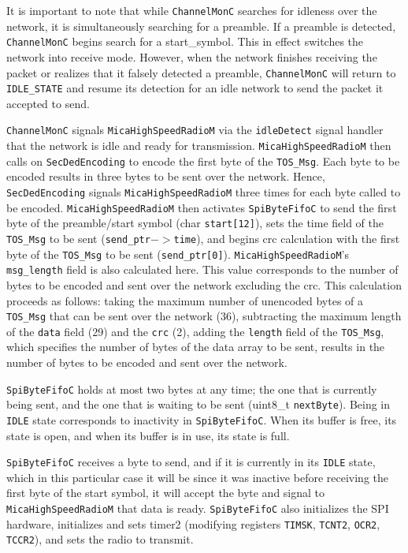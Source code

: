 \documentclass[11pt]{article}
\begin{document}
It is important to note that while {\tt ChannelMonC} searches for idleness
over the network, it is simultaneously searching for a preamble. If a
preamble is detected, {\tt ChannelMonC} begins search for a start\_symbol.
This in effect switches the network into receive mode.  However,
when the network finishes receiving the packet or realizes that it
falsely detected a preamble, {\tt ChannelMonC} will return to {\tt IDLE\_STATE}
and resume its detection for an idle network to send the packet it
accepted to send. 

{\tt ChannelMonC} signals {\tt MicaHighSpeedRadioM} via the {\tt idleDetect} signal
handler that the network is idle and ready for transmission.
{\tt MicaHighSpeedRadioM} then calls on {\tt SecDedEncoding} to encode the first
byte of the {\tt TOS\_Msg}.  Each byte to be encoded results in three bytes
to be sent over the network. Hence, {\tt SecDedEncoding} signals
{\tt MicaHighSpeedRadioM} three times for each byte called to be
encoded. {\tt MicaHighSpeedRadioM} then activates {\tt SpiByteFifoC} to send the
first byte of the preamble/start symbol (char {\tt start[12]}), sets the
time field of the {\tt TOS\_Msg} to be sent ({\tt send\_ptr$->$time}), and begins crc
calculation with the first byte of the {\tt TOS\_Msg} to be sent
({\tt send\_ptr[0]}). {\tt MicaHighSpeedRadioM}'s {\tt msg\_length} field is also
calculated here. This value corresponds to the number of bytes to be
encoded and sent over the network excluding the crc. This calculation proceeds as follows: taking the
maximum number of unencoded bytes of a {\tt TOS\_Msg} that can be sent over
the network (36), subtracting the maximum length of the {\tt data} field
(29) and the {\tt crc} (2), adding the {\tt length} field of the
{\tt TOS\_Msg}, which specifies the number of bytes of the data array to be sent,
results in the number of bytes to be encoded and sent over the
network.  

{\tt SpiByteFifoC} holds at most two bytes at any time; the one that is
currently being sent, and the one that is waiting to be sent (uint8\_t
{\tt nextByte}). Being in {\tt IDLE} state corresponds to inactivity in
{\tt SpiByteFifoC}. When its buffer is free, its state is open, and when its buffer is
in use, its state is full.

{\tt SpiByteFifoC} receives a byte to send, and if it is
currently in its {\tt IDLE} state, which in this particular case it will be
since it was inactive before receiving the first byte of the start
symbol, it will accept the byte and signal to
{\tt MicaHighSpeedRadioM} that data is ready. {\tt SpiByteFifoC} also initializes
the SPI hardware, initializes and sets timer2 (modifying registers
{\tt TIMSK}, {\tt TCNT2}, {\tt OCR2}, {\tt TCCR2}), and sets the radio to transmit.
\end{document}
